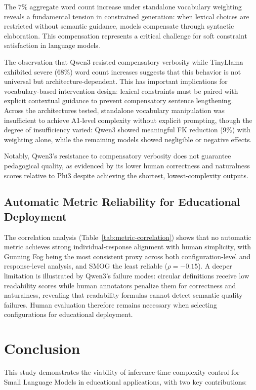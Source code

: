 \documentclass[10pt, a4paper]{article}
\begin{document}
The $7\%$ aggregate word count increase under standalone vocabulary weighting reveals a fundamental tension in constrained generation: when lexical choices are restricted without semantic guidance, models compensate through syntactic elaboration. This compensation represents a critical challenge for soft constraint satisfaction in language models.

The observation that Qwen3 resisted compensatory verbosity while TinyLlama exhibited severe ($68\%$) word count increases suggests that this behavior is not universal but architecture-dependent. This has important implications for vocabulary-based intervention design: lexical constraints must be paired with explicit contextual guidance to prevent compensatory sentence lengthening. Across the architectures tested, standalone vocabulary manipulation was insufficient to achieve A1-level complexity without explicit prompting, though the degree of insufficiency varied: Qwen3 showed meaningful FK reduction ($9\%$) with weighting alone, while the remaining models showed negligible or negative effects.

Notably, Qwen3's resistance to compensatory verbosity does not guarantee pedagogical quality, as evidenced by its lower human correctness and naturalness scores relative to Phi3 despite achieving the shortest, lowest-complexity outputs.

\subsection{Automatic Metric Reliability for Educational Deployment}
The correlation analysis (Table~\ref{tab:metric-correlation}) shows that no automatic metric achieves strong individual-response alignment with human simplicity, with Gunning Fog being the most consistent proxy across both configuration-level and response-level analysis, and SMOG the least reliable ($\rho=-0.15$). A deeper limitation is illustrated by Qwen3's failure modes: circular definitions receive low readability scores while human annotators penalize them for correctness and naturalness, revealing that readability formulas cannot detect semantic quality failures. Human evaluation therefore remains necessary when selecting configurations for educational deployment.


\section{Conclusion}

This study demonstrates the viability of inference-time complexity control for Small Language Models in educational applications, with two key contributions:
\end{document}
